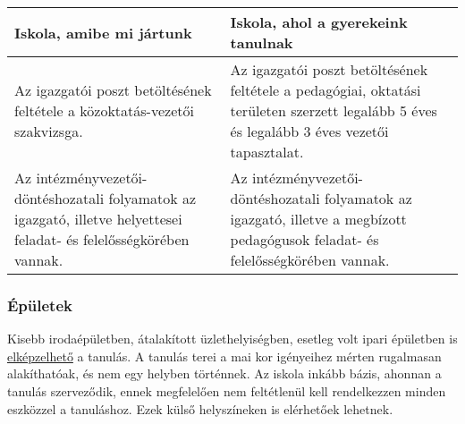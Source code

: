 \begin{longtable}[]{@{}ll@{}}
\toprule
\begin{minipage}[b]{0.43\columnwidth}\raggedright
Iskola, amibe mi jártunk\strut
\end{minipage} & \begin{minipage}[b]{0.51\columnwidth}\raggedright
Iskola, ahol a gyerekeink tanulnak\strut
\end{minipage}\tabularnewline
\midrule
\endhead
\begin{minipage}[t]{0.43\columnwidth}\raggedright
Az igazgatói poszt betöltésének feltétele a közoktatás-vezetői
szakvizsga.\strut
\end{minipage} & \begin{minipage}[t]{0.51\columnwidth}\raggedright
Az igazgatói poszt betöltésének feltétele a pedagógiai, oktatási
területen szerzett legalább 5 éves és legalább 3 éves vezetői
tapasztalat.\strut
\end{minipage}\tabularnewline
\begin{minipage}[t]{0.43\columnwidth}\raggedright
Az intézményvezetői-döntéshozatali folyamatok az igazgató, illetve
helyettesei feladat- és felelősségkörében vannak.\strut
\end{minipage} & \begin{minipage}[t]{0.51\columnwidth}\raggedright
Az intézményvezetői-döntéshozatali folyamatok az igazgató, illetve a
megbízott pedagógusok feladat- és felelősségkörében vannak.\strut
\end{minipage}\tabularnewline
\bottomrule
\end{longtable}

\hypertarget{epuletek}{%
\subsubsection{Épületek}\label{epuletek}}

Kisebb irodaépületben, átalakított üzlethelyiségben, esetleg volt ipari
épületben is \href{/jogszabalyok/epuletek.md}{elképzelhető} a tanulás. A
tanulás terei a mai kor igényeihez mérten rugalmasan alakíthatóak, és
nem egy helyben történnek. Az iskola inkább bázis, ahonnan a tanulás
szerveződik, ennek megfelelően nem feltétlenül kell rendelkezzen minden
eszközzel a tanuláshoz. Ezek külső helyszíneken is elérhetőek lehetnek.

